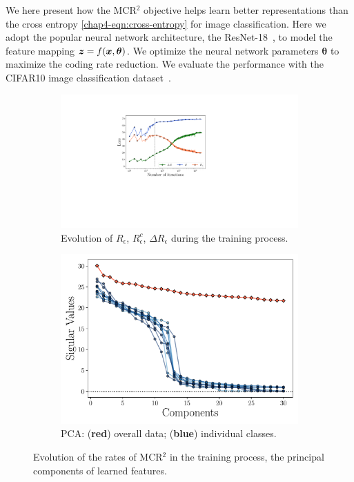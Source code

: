\documentclass[../../book-main.tex]{subfiles}
\begin{document}
\begin{example}
	We here present how the MCR$^2$ objective helps learn better representations than the cross entropy \eqref{chap4-eqn:cross-entropy} for image classification. Here we adopt the popular neural network architecture, the ResNet-18~\cite{he2016deep}, to model the feature mapping $\bm{z} = f(\bm{x},\bm \theta)$. We optimize the neural network parameters $\bm \theta$ to maximize the coding rate reduction. We evaluate the performance with the CIFAR10 image classification dataset~\cite{krizhevsky2009learning}.

	\begin{figure}[t]
		\begin{subfigure}[t]{0.42\textwidth}
			\centering
			\includegraphics[width=\textwidth]{chapters/chapter3/figs/loss_log.pdf}
			\caption{Evolution of $R_\epsilon$, $R^c_\epsilon$, $\Delta R_\epsilon$ during the training process.}
			\label{fig:train-test-loss-pca-1}
		\end{subfigure}
		\hfill
		\begin{subfigure}[t]{0.42\textwidth}
			\centering
			\includegraphics[width=\textwidth]{chapters/chapter3/figs/pca_mainline.pdf}
			\caption{PCA: {\small (\textbf{red}) overall data; (\textbf{blue}) individual classes}.}
			\label{fig:train-test-loss-pca-3}
		\end{subfigure}
		\caption{\small Evolution of the rates of MCR$^2$ in the training process, the principal components of learned features.}
		\label{fig:train-test-loss-pca}
	\end{figure}


\end{example}
\end{document}
